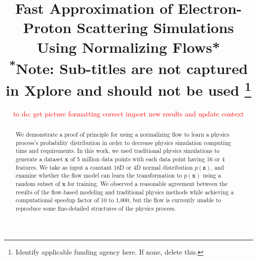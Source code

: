 \documentclass[conference]{IEEEtran}
\begin{document}
\title{Fast Approximation of Electron-Proton Scattering Simulations Using Normalizing Flows*\\
{\footnotesize \textsuperscript{*}Note: Sub-titles are not captured in Xplore and
should not be used}
\thanks{Identify applicable funding agency here. If none, delete this.}
}

\author{
\and
{}
\and
{}
\and
{}
\and
\textcolor{red}{to do:
get picture formatting correct
import new results and update context}
}

\maketitle

\begin{abstract}
We demonstrate a proof of principle for using a normalizing flow to learn a physics process's probability distribution in order to decrease physics simulation computing time and requirements. In this work, we used traditional physics simulations to generate a dataset $\mathbf{x}$ of 5 million data points with each data point having 16 or 4 features.  We take as input a constant 16D or 4D normal distribution $p(\mathbf{z})$, and examine whether the flow model can learn the transformation to $p(\mathbf{x})$ using a random subset of $\mathbf{x}$ for training. We observed a reasonable agreement between the results of the flow-based modeling and traditional physics methods while achieving a computational speedup factor of 10 to 1,000, but the flow is currently unable to reproduce some fine-detailed structures of the physics process.
\end{abstract}
\end{document}
